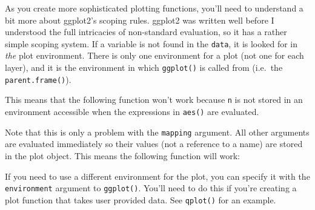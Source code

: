 As you create more sophisticated plotting functions, you'll need to
understand a bit more about ggplot2's scoping rules. ggplot2 was written
well before I understood the full intricacies of non-standard
evaluation, so it has a rather simple scoping system. If a variable is
not found in the \texttt{data}, it is looked for in \emph{the} plot
environment. There is only one environment for a plot (not one for each
layer), and it is the environment in which \texttt{ggplot()} is called
from (i.e.~the \texttt{parent.frame()}). 

This means that the following function won't work because \texttt{n} is
not stored in an environment accessible when the expressions in
\texttt{aes()} are evaluated.

\begin{Shaded}
\begin{Highlighting}[]
\StringTok{ }
  \StringTok{ }
  \NormalTok{(}\StringTok{ }
\NormalTok{\}}
\StringTok{ }\NormalTok{(} \NormalTok{:}\NormalTok{, } \NormalTok{:}\NormalTok{)}
\StringTok{ }\NormalTok{()}
\end{Highlighting}
\end{Shaded}

Note that this is only a problem with the \texttt{mapping} argument. All
other arguments are evaluated immediately so their values (not a
reference to a name) are stored in the plot object. This means the
following function will work:

\begin{Shaded}
\begin{Highlighting}[]
\StringTok{ }
  \NormalTok{(} 
\NormalTok{\}}
\StringTok{ }\NormalTok{()}
\end{Highlighting}
\end{Shaded}

If you need to use a different environment for the plot, you can specify
it with the \texttt{environment} argument to \texttt{ggplot()}. You'll
need to do this if you're creating a plot function that takes user
provided data. See \texttt{qplot()} for an example.

